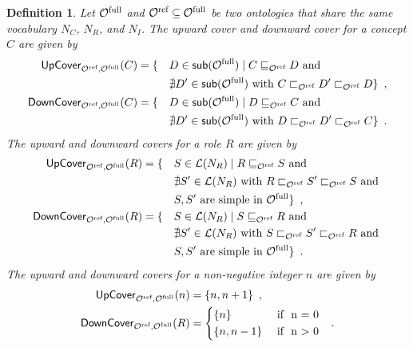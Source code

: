 \documentclass[
]{ceurart}
\newtheorem{definition}{Definition}
\begin{document}
\begin{definition} \label{def:covers}
  Let ${\mathcal{O}^\textnormal{full}}$ and ${\mathcal{O}^\textnormal{ref}} \subseteq {\mathcal{O}^\textnormal{full}}$ be two \SROIQ ontologies that share the same vocabulary $N_C$, $N_R$, and $N_I$. The \emph{upward cover} and \emph{downward cover} for a concept $C$ are given by
  {\footnotesize
  \begin{alignat*}{2}
    {\ensuremath{\mathsf{UpCover}}}_{{\mathcal{O}^\textnormal{ref}},{\mathcal{O}^\textnormal{full}}}(C) &= \{ &&D \in \mathop{\mathsf{sub}}({\mathcal{O}^\textnormal{full}}) \mid C \sqsubseteq_{\mathcal{O}^\textnormal{ref}} D \text{ and } \\
    &&&\nexists D' \in \mathop{\mathsf{sub}}({\mathcal{O}^\textnormal{full}}) \text{ with } C \sqsubset_{\mathcal{O}^\textnormal{ref}} D' \sqsubset_{\mathcal{O}^\textnormal{ref}} D \} \enspace, \\
    {\mathsf{DownCover}}_{{\mathcal{O}^\textnormal{ref}},{\mathcal{O}^\textnormal{full}}}(C) &= \{ &&D \in \mathop{\mathsf{sub}}({\mathcal{O}^\textnormal{full}}) \mid D \sqsubseteq_{\mathcal{O}^\textnormal{ref}} C \text{ and } \\
    &&&\nexists D' \in \mathop{\mathsf{sub}}({\mathcal{O}^\textnormal{full}}) \text{ with } D \sqsubset_{\mathcal{O}^\textnormal{ref}} D' \sqsubset_{\mathcal{O}^\textnormal{ref}} C \} \enspace.
  \end{alignat*}
  }
  The upward and downward covers for a role $R$ are given by
  {\footnotesize
  \begin{alignat*}{2}
    {\ensuremath{\mathsf{UpCover}}}_{{\mathcal{O}^\textnormal{ref}},{\mathcal{O}^\textnormal{full}}}(R) &= \{ &&S \in \mathcal{L}(N_R) \mid R \sqsubseteq_{\mathcal{O}^\textnormal{ref}} S \text{ and } \\
    &&& \nexists S' \in \mathcal{L}(N_R) \text{ with } R \sqsubset_{\mathcal{O}^\textnormal{ref}} S' \sqsubset_{\mathcal{O}^\textnormal{ref}} S \text{ and } \\
    &&& S, S' \text{ are simple in } {\mathcal{O}^\textnormal{full}} \} \enspace, \\
    {\mathsf{DownCover}}_{{\mathcal{O}^\textnormal{ref}},{\mathcal{O}^\textnormal{full}}}(R) &= \{ &&S \in \mathcal{L}(N_R) \mid S \sqsubseteq_{\mathcal{O}^\textnormal{ref}} R \text{ and } \\
    &&&\nexists S' \in \mathcal{L}(N_R) \text{ with } S \sqsubset_{\mathcal{O}^\textnormal{ref}} S' \sqsubset_{\mathcal{O}^\textnormal{ref}} R \text{ and } \\
    &&& S, S' \text{ are simple in } {\mathcal{O}^\textnormal{full}} \} \enspace.
  \end{alignat*}
  }
  The upward and downward covers for a non-negative integer $n$ are given by
  {\footnotesize
  \begin{alignat*}{2}
    \UpC_{\Omcref,\Omcfull}(n) &= \{ n, n + 1 \} \enspace, \\
    \DownC_{\Omcref,\Omcfull}(R) &=
    \begin{cases*}
      \{ n \} & \text{ if } n = 0 \\
      \{ n, n - 1 \} & \text{ if } n > 0
    \end{cases*} \enspace.
  \end{alignat*}
  }
\end{definition}
\end{document}
